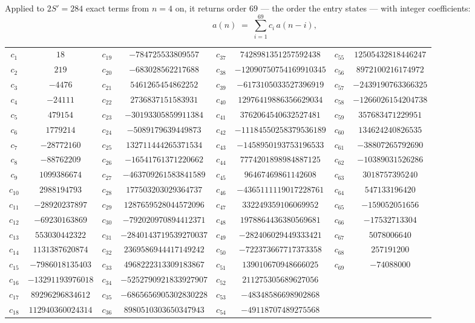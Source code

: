 \documentclass[11pt,a4paper]{article}
\theoremstyle{plain}
\theoremstyle{definition}
\begin{document}
Applied to $2S'=284$ exact terms from $n=4$ on, it returns order $69$ --- the
order the entry states --- with integer coefficients:
\[
a(n)\;=\;\sum_{i=1}^{69}c_i\,a(n-i),
\]
\begin{center}\small
\begin{tabular}{cccccccc}
$c_{1}$ & $18$ & $c_{19}$ & $-784725533809557$ & $c_{37}$ & $7428981351257592438$ & $c_{55}$ & $12505432818446247$ \\
$c_{2}$ & $219$ & $c_{20}$ & $-683028562217688$ & $c_{38}$ & $-12090750754169910345$ & $c_{56}$ & $8972100216174972$ \\
$c_{3}$ & $-4476$ & $c_{21}$ & $5461265454862252$ & $c_{39}$ & $-6173105033527396919$ & $c_{57}$ & $-2439190763366325$ \\
$c_{4}$ & $-24111$ & $c_{22}$ & $2736837151583931$ & $c_{40}$ & $12976419886356629034$ & $c_{58}$ & $-1266026154204738$ \\
$c_{5}$ & $479154$ & $c_{23}$ & $-30193305859911384$ & $c_{41}$ & $3762064540632527481$ & $c_{59}$ & $357683471229951$ \\
$c_{6}$ & $1779214$ & $c_{24}$ & $-5089179639449873$ & $c_{42}$ & $-11184550258379536189$ & $c_{60}$ & $134624240826535$ \\
$c_{7}$ & $-28772160$ & $c_{25}$ & $132711444265371534$ & $c_{43}$ & $-1458950193753196533$ & $c_{61}$ & $-38807265792690$ \\
$c_{8}$ & $-88762209$ & $c_{26}$ & $-16541761371220662$ & $c_{44}$ & $7774201898984887125$ & $c_{62}$ & $-10389031526286$ \\
$c_{9}$ & $1099386674$ & $c_{27}$ & $-463709261583841589$ & $c_{45}$ & $96467469861142608$ & $c_{63}$ & $3018757395240$ \\
$c_{10}$ & $2988194793$ & $c_{28}$ & $177503203029364737$ & $c_{46}$ & $-4365111119017228761$ & $c_{64}$ & $547133196420$ \\
$c_{11}$ & $-28920237897$ & $c_{29}$ & $1287659528044572096$ & $c_{47}$ & $332249359106069952$ & $c_{65}$ & $-159052051656$ \\
$c_{12}$ & $-69230163869$ & $c_{30}$ & $-792020970894412371$ & $c_{48}$ & $1978864436380569681$ & $c_{66}$ & $-17532713304$ \\
$c_{13}$ & $553030442322$ & $c_{31}$ & $-2840143719539270037$ & $c_{49}$ & $-282406029449333421$ & $c_{67}$ & $5078006640$ \\
$c_{14}$ & $1131387620874$ & $c_{32}$ & $2369586944417149242$ & $c_{50}$ & $-722373667717373358$ & $c_{68}$ & $257191200$ \\
$c_{15}$ & $-7986018135403$ & $c_{33}$ & $4968222313309183867$ & $c_{51}$ & $139010670948666025$ & $c_{69}$ & $-74088000$ \\
$c_{16}$ & $-13291193976018$ & $c_{34}$ & $-5252790921833927907$ & $c_{52}$ & $211275305689627056$ &  &  \\
$c_{17}$ & $89296296834612$ & $c_{35}$ & $-6865656905302830228$ & $c_{53}$ & $-48348586698902868$ &  &  \\
$c_{18}$ & $112940360024314$ & $c_{36}$ & $8980510303650347943$ & $c_{54}$ & $-49118707489275568$ &  &  \\
\end{tabular}
\end{center}
\end{document}
